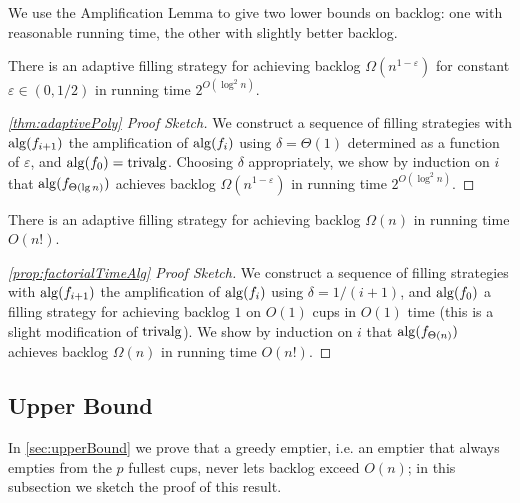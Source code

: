 We use the Amplification Lemma to give two lower bounds on
backlog: one with reasonable running time, the other with
slightly better backlog.

\begin{theorem}
  There is an adaptive filling strategy for achieving backlog
  $\Omega(n^{1-\varepsilon})$ for constant $\varepsilon \in (0,
  1/2)$ in running time $2^{O(\log^2 n)}$. 
\end{theorem}
\begin{proof}[\cref{thm:adaptivePoly} Proof Sketch]
We construct a sequence of
filling strategies with $\operatorname{\text{\textup{alg}}}(f_{i+1})$ the amplification of
$\operatorname{\text{\textup{alg}}}(f_i)$ using $\delta = \Theta(1)$ determined as a
function of $\varepsilon$, and $\operatorname{\text{\textup{alg}}}(f_0)=\operatorname{\text{\textup{trivalg}}}$.
Choosing $\delta$ appropriately, we show by induction on $i$ that
$\operatorname{\text{\textup{alg}}}(f_{\Theta(\lg n)})$ achieves backlog
$\Omega(n^{1-\varepsilon})$ in running time $2^{O(\log^2 n)}$.
\end{proof}

\begin{theorem}
  There is an adaptive filling strategy for achieving backlog
  $\Omega(n)$ in running time $O(n!)$.
\end{theorem}
\begin{proof}[\cref{prop:factorialTimeAlg} Proof Sketch]
We construct a sequence of filling strategies with $\operatorname{\text{\textup{alg}}}(f_{i+1})$ the
amplification of $\operatorname{\text{\textup{alg}}}(f_i)$ using $\delta = 1/(i+1)$, and
$\operatorname{\text{\textup{alg}}}(f_0)$ a filling strategy for achieving backlog $1$ on
$O(1)$ cups in $O(1)$ time (this is a slight modification of
$\operatorname{\text{\textup{trivalg}}}$). We show by induction on $i$ that
$\operatorname{\text{\textup{alg}}}(f_{\Theta(n)})$ achieves backlog $\Omega(n)$ in running
time $O(n!)$.
\end{proof}

\subsection{Upper Bound}
In \cref{sec:upperBound} we prove that a greedy emptier, i.e. an
emptier that always empties from the $p$ fullest cups, never lets
backlog exceed $O(n)$; in this subsection we sketch the proof of
this result.

